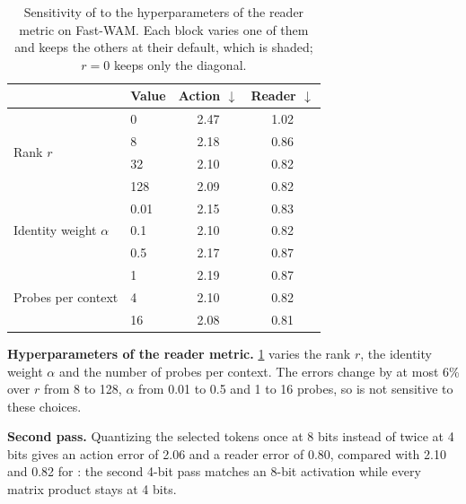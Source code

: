 \begin{table}[t]
  \centering
  \small
  \setlength{\tabcolsep}{5pt}
  \begin{tabular}{@{}llcc@{}}
    \toprule
    & Value & Action $\downarrow$ & Reader $\downarrow$ \\
    \midrule
    \multirow{4}{*}{Rank $r$}
      & 0   & 2.47 & 1.02 \\
      & 8   & 2.18 & 0.86 \\
      & \cellcolor{gray!12}32 & \cellcolor{gray!12}2.10 & \cellcolor{gray!12}0.82 \\
      & 128 & 2.09 & 0.82 \\
    \midrule
    \multirow{3}{*}{Identity weight $\alpha$}
      & 0.01 & 2.15 & 0.83 \\
      & \cellcolor{gray!12}0.1 & \cellcolor{gray!12}2.10 & \cellcolor{gray!12}0.82 \\
      & 0.5  & 2.17 & 0.87 \\
    \midrule
    \multirow{3}{*}{Probes per context}
      & 1  & 2.19 & 0.87 \\
      & \cellcolor{gray!12}4 & \cellcolor{gray!12}2.10 & \cellcolor{gray!12}0.82 \\
      & 16 & 2.08 & 0.81 \\
    \bottomrule
  \end{tabular}
  \caption{Sensitivity of \method to the hyperparameters of the reader metric on Fast-WAM.
  Each block varies one of them and keeps the others at their default, which is shaded; $r = 0$ keeps only the diagonal.}
  \label{tab:supp:metric}
\end{table}

\noindent\textbf{Hyperparameters of the reader metric.}
\cref{tab:supp:metric} varies the rank $r$, the identity weight $\alpha$ and the number of probes per context.
The errors change by at most 6\% over $r$ from 8 to 128, $\alpha$ from 0.01 to 0.5 and 1 to 16 probes, so \method is not sensitive to these choices.

\noindent\textbf{Second pass.}
Quantizing the selected tokens once at 8 bits instead of twice at 4 bits gives an action error of 2.06 and a reader error of 0.80, compared with 2.10 and 0.82 for \method: the second 4-bit pass matches an 8-bit activation while every matrix product stays at 4 bits.

